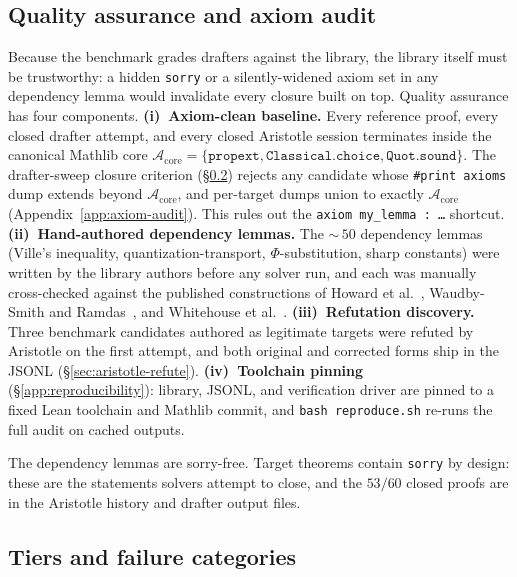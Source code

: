 \subsection{Quality assurance and axiom audit}
\label{sec:methods-qa}

Because the benchmark grades drafters against the library, the library
itself must be trustworthy: a hidden \texttt{sorry} or a
silently-widened axiom set in any dependency lemma would invalidate
every closure built on top. Quality assurance has four components.
\textbf{(i)~Axiom-clean baseline.} Every reference proof, every closed
drafter attempt, and every closed Aristotle session terminates inside
the canonical Mathlib core $\mathcal{A}_{\text{core}} = \{\texttt{propext},
\texttt{Classical.choice}, \texttt{Quot.sound}\}$. The drafter-sweep
closure criterion (\S\ref{sec:methods-tiers}) rejects any candidate
whose \texttt{\#print axioms} dump extends beyond
$\mathcal{A}_{\text{core}}$, and per-target dumps union to exactly
$\mathcal{A}_{\text{core}}$ (Appendix~\ref{app:axiom-audit}). This
rules out the \texttt{axiom my\_lemma : \dots} shortcut.
\textbf{(ii)~Hand-authored dependency lemmas.} The $\sim$\,$50$
dependency lemmas (Ville's inequality, quantization-transport,
$\Phi$-substitution, sharp constants) were written by the library
authors before any solver run, and each was manually cross-checked
against the published constructions of
Howard et al.~\cite{howard2021time},
Waudby-Smith and Ramdas~\cite{waudbysmith2024estimating}, and
Whitehouse et al.~\cite{whitehouse2025timeuniform}.
\textbf{(iii)~Refutation discovery.} Three benchmark candidates
authored as legitimate targets were refuted by Aristotle on the first
attempt, and both original and corrected forms ship in the JSONL
(\S\ref{sec:aristotle-refute}).
\textbf{(iv)~Toolchain pinning} (\S\ref{app:reproducibility}): library,
JSONL, and verification driver are pinned to a fixed Lean toolchain
and Mathlib commit, and \texttt{bash reproduce.sh} re-runs the full
audit on cached outputs.

The dependency lemmas are sorry-free. Target theorems contain
\texttt{sorry} by design: these are the statements solvers attempt
to close, and the $53/60$ closed proofs are in the Aristotle history
and drafter output files.

\subsection{Tiers and failure categories}
\label{sec:methods-tiers}

